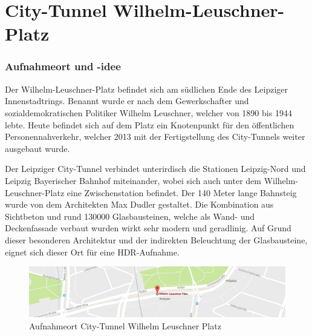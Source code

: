 \documentclass[liststotoc,bibtotoc,fontsize=14pt,]{scrreprt}
\begin{document}
	\section{City-Tunnel Wilhelm-Leuschner-Platz }
	\label{sec:tunnel}
	\subsubsection{Aufnahmeort und -idee}
	Der Wilhelm-Leuschner-Platz befindet sich am südlichen Ende des Leipziger Innenstadtrings. Benannt wurde er nach dem Gewerkschafter und sozialdemokratischen Politiker Wilhelm Leuschner, welcher von 1890 bis 1944 lebte. Heute befindet sich auf dem Platz ein Knotenpunkt für den öffentlichen Personennahverkehr, welcher 2013 mit der Fertigstellung des City-Tunnels weiter ausgebaut wurde. 
	
	\bigskip
	Der Leipziger City-Tunnel verbindet unterirdisch die Stationen Leipzig-Nord und Leipzig Bayerischer Bahnhof miteinander, wobei sich auch unter dem Wilhelm-Leuschner-Platz eine Zwischenstation befindet. Der 140 Meter lange Bahnsteig wurde von dem Architekten Max Dudler  gestaltet. Die Kombination aus Sichtbeton und rund 130000 Glasbausteinen, welche als Wand- und Deckenfassade verbaut wurden wirkt sehr modern und geradlinig. Auf Grund dieser besonderen Architektur und der indirekten Beleuchtung der Glasbausteine, eignet sich dieser Ort für eine HDR-Aufnahme.
	
\begin{figure}[H]
	\includegraphics[width=\linewidth]{img/places/leuscher_map.jpg}
	\caption{Aufnahmeort City-Tunnel Wilhelm Leuschner Platz}
	\label{img:ak_map}
\end{figure}
\end{document}
